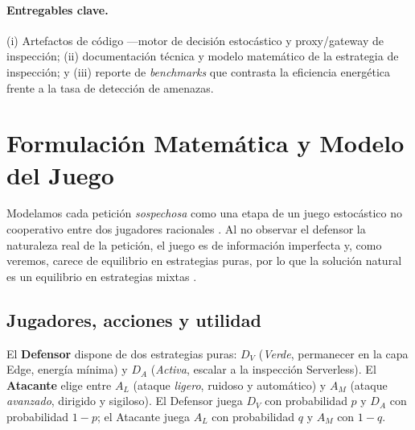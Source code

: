 \documentclass[10pt,twocolumn]{article}
\begin{document}
\paragraph{Entregables clave.} (i) Artefactos de c\'odigo ---motor de decisi\'on
estoc\'astico y proxy/gateway de inspecci\'on; (ii) documentaci\'on t\'ecnica y modelo
matem\'atico de la estrategia de inspecci\'on; y (iii) reporte de \emph{benchmarks}
que contrasta la eficiencia energ\'etica frente a la tasa de detecci\'on de amenazas.

\section{Formulaci\'on Matem\'atica y Modelo del Juego}
\label{sec:math}
Modelamos cada petici\'on \emph{sospechosa} como una etapa de un juego estoc\'astico
no cooperativo entre dos jugadores racionales \cite{alpcan}. Al no observar el
defensor la naturaleza real de la petici\'on, el juego es de informaci\'on imperfecta
y, como veremos, carece de equilibrio en estrategias puras, por lo que la soluci\'on
natural es un equilibrio en estrategias mixtas \cite{manshaei}.

\subsection{Jugadores, acciones y utilidad}
El \textbf{Defensor} dispone de dos estrategias puras: $D_V$ (\emph{Verde},
permanecer en la capa Edge, energ\'ia m\'inima) y $D_A$ (\emph{Activa}, escalar a la
inspecci\'on Serverless). El \textbf{Atacante} elige entre $A_L$ (ataque
\emph{ligero}, ruidoso y autom\'atico) y $A_M$ (ataque \emph{avanzado}, dirigido y
sigiloso). El Defensor juega $D_V$ con probabilidad $p$ y $D_A$ con probabilidad
$1-p$; el Atacante juega $A_L$ con probabilidad $q$ y $A_M$ con $1-q$.
\end{document}
